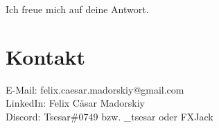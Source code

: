 \documentclass[fontsize=12]{scrartcl}
\begin{document}
	\noindent Ich freue mich auf deine Antwort.
	
	\section{Kontakt}
	
	E-Mail: felix.caesar.madorskiy@gmail.com\\
	LinkedIn: Felix Cäsar Madorskiy\\
	Discord: Tsesar\#0749 bzw. \_tsesar oder FXJack
	
	
	
\end{document}
